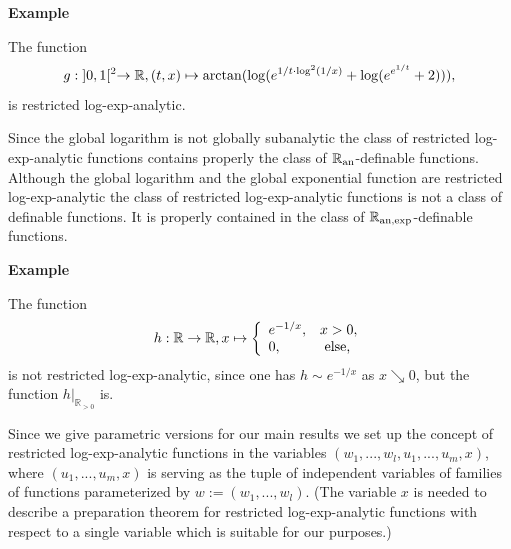 \documentclass[12pt]{article}
\def\vs{\vspace}
\begin{document}
\vs{0.4cm}
{\bf Example}

\vs{0.1cm}
The function
$$g: \textnormal{}]0,1[^2 \to \mathbb{R}, (t,x) \mapsto \arctan(\log(e^{1/t \cdot \log^2(1/x)}+\log(e^{e^{1/t}}+2))),$$ 
is restricted log-exp-analytic.

\vs{0.5cm}
Since the global logarithm is not globally subanalytic the class of restricted log-exp-analytic functions contains properly the class of $\mathbb{R}_{\textnormal{an}}$-definable functions. Although the global logarithm and the global exponential function are restricted log-exp-analytic the class of restricted log-exp-analytic functions is not a class of definable functions. It is properly contained in the class of $\mathbb{R}_{\textnormal{an,exp}}$-definable functions.

\vs{0.4cm}
{\bf Example}

\vs{0.1cm}
The function
$$h: \mathbb{R} \to \mathbb{R}, x \mapsto \left\{\begin{array}{ll} e^{-1/x}, & x > 0, \\
0, & \textnormal{ else, } \end{array}\right.$$
is not restricted log-exp-analytic, since one has $h \sim e^{-1/x}$ as $x \searrow 0$, but the function $h|_{\mathbb{R}_{>0}}$ is.

\vs{0.2cm}

\vs{0.1cm}
Since we give parametric versions for our main results we set up the concept of restricted log-exp-analytic functions in the variables $(w_1,...,w_l,u_1,...,u_m,x)$, where $(u_1,...,u_m,x)$ is serving as the tuple of independent variables of families of functions parameterized by $w:=(w_1,...,w_l)$. (The variable $x$ is needed to describe a preparation theorem for restricted log-exp-analytic functions with respect to a single variable which is suitable for our purposes.)
\end{document}
